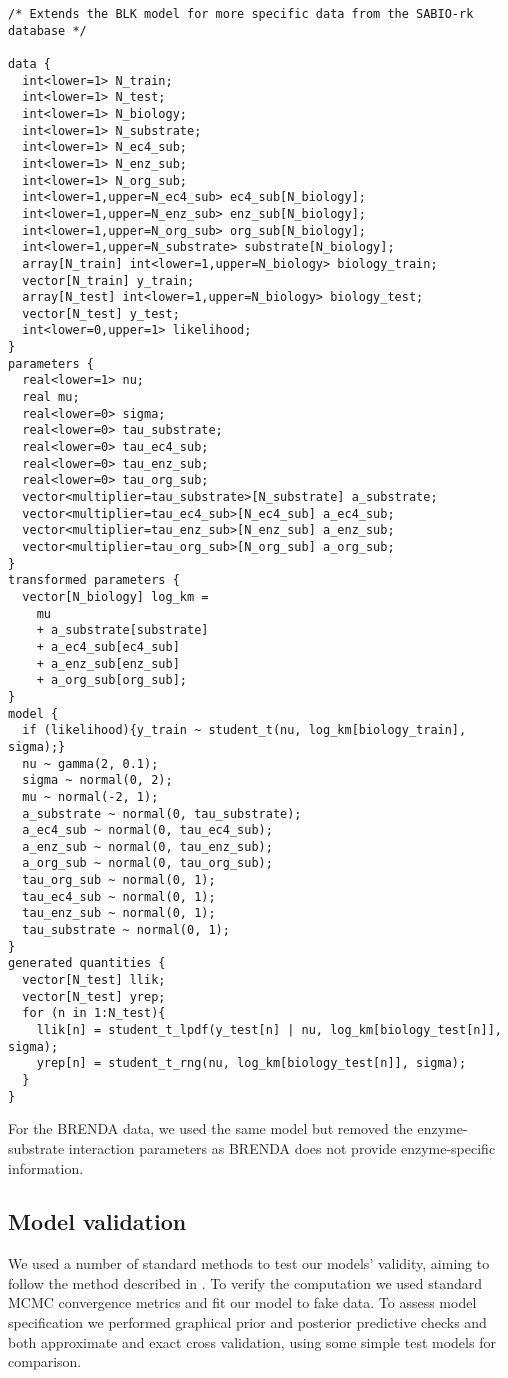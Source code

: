 \documentclass[11pt]{article}
\begin{document}
\begin{verbatim}
/* Extends the BLK model for more specific data from the SABIO-rk database */

data {
  int<lower=1> N_train;
  int<lower=1> N_test;
  int<lower=1> N_biology;
  int<lower=1> N_substrate;
  int<lower=1> N_ec4_sub;
  int<lower=1> N_enz_sub;
  int<lower=1> N_org_sub;
  int<lower=1,upper=N_ec4_sub> ec4_sub[N_biology];
  int<lower=1,upper=N_enz_sub> enz_sub[N_biology];
  int<lower=1,upper=N_org_sub> org_sub[N_biology];
  int<lower=1,upper=N_substrate> substrate[N_biology];
  array[N_train] int<lower=1,upper=N_biology> biology_train;
  vector[N_train] y_train;
  array[N_test] int<lower=1,upper=N_biology> biology_test;
  vector[N_test] y_test;
  int<lower=0,upper=1> likelihood;
}
parameters {
  real<lower=1> nu;
  real mu;
  real<lower=0> sigma;
  real<lower=0> tau_substrate;
  real<lower=0> tau_ec4_sub;
  real<lower=0> tau_enz_sub;
  real<lower=0> tau_org_sub;
  vector<multiplier=tau_substrate>[N_substrate] a_substrate;
  vector<multiplier=tau_ec4_sub>[N_ec4_sub] a_ec4_sub;
  vector<multiplier=tau_enz_sub>[N_enz_sub] a_enz_sub;
  vector<multiplier=tau_org_sub>[N_org_sub] a_org_sub;
}
transformed parameters {
  vector[N_biology] log_km =
    mu
    + a_substrate[substrate]
    + a_ec4_sub[ec4_sub]
    + a_enz_sub[enz_sub]
    + a_org_sub[org_sub];
}
model {
  if (likelihood){y_train ~ student_t(nu, log_km[biology_train], sigma);}
  nu ~ gamma(2, 0.1);
  sigma ~ normal(0, 2);
  mu ~ normal(-2, 1);
  a_substrate ~ normal(0, tau_substrate);
  a_ec4_sub ~ normal(0, tau_ec4_sub);
  a_enz_sub ~ normal(0, tau_enz_sub);
  a_org_sub ~ normal(0, tau_org_sub);
  tau_org_sub ~ normal(0, 1);
  tau_ec4_sub ~ normal(0, 1);
  tau_enz_sub ~ normal(0, 1);
  tau_substrate ~ normal(0, 1);
}
generated quantities {
  vector[N_test] llik;
  vector[N_test] yrep;
  for (n in 1:N_test){
    llik[n] = student_t_lpdf(y_test[n] | nu, log_km[biology_test[n]], sigma);
    yrep[n] = student_t_rng(nu, log_km[biology_test[n]], sigma);
  }
}
\end{verbatim}

For the BRENDA data, we used the same model but removed the enzyme-substrate
interaction parameters as BRENDA does not provide enzyme-specific information.

\subsection{Model validation}
\label{sec:org903f537}
We used a number of standard methods to test our models' validity, aiming to
follow the method described in . To verify the
computation we used standard MCMC convergence metrics and fit our model to fake
data. To assess model specification we performed graphical prior and posterior
predictive checks and both approximate and exact cross validation, using some
simple test models for comparison.
\end{document}
